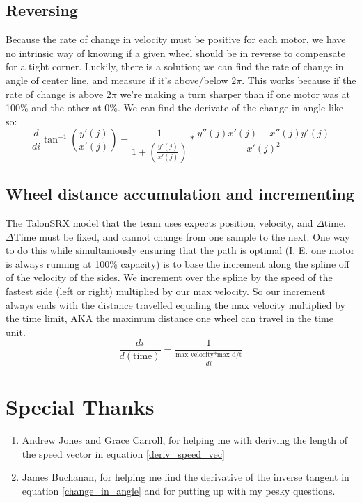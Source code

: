 \documentclass[12pt, english]{article}
\begin{document}
\subsection{Reversing}
Because the rate of change in velocity must be positive for each motor, we have no intrinsic way of knowing if a given wheel should be in reverse to compensate for a tight corner. Luckily, there is a solution; we can find the rate of change in angle of center line, and measure if it's above/below $2\pi$. This works because if the rate of change is above $2\pi$ we're making a turn sharper than if one motor was at 100\% and the other at 0\%. We can find the derivate of the change in angle like so:
\begin{equation}
	\label{change_in_angle}
	\frac{d}{di} 
	\tan^{-1}{\left(\frac{y'(j)}{x'(j)}\right)} = 
	\frac{1}{1 + \left(\frac{y'(j)}{x'(j)}\right)} * \frac{y''(j)x'(j) - x''(j)y'(j)}{x'(j)^2}
\end{equation}


\subsection{Wheel distance accumulation and incrementing}
The TalonSRX model that the team uses expects position, velocity, and $\Delta$time. $\Delta$Time must be fixed, and cannot change from one sample to the next. One way to do this while simultaniously ensuring that the path is optimal (I. E. one motor is always running at 100\% capacity) is to base the increment along the spline off of the velocity of the sides. We increment over the spline by the speed of the fastest side (left or right) multiplied by our max velocity. So our increment always ends with the distance travelled equaling the max velocity multiplied by the time limit, AKA the maximum distance one wheel can travel in the time unit.
\begin{equation}
	\frac{di}{d(\text{time})} = \frac{1}{\frac{\text{max velocity} * \text{max d/t}}{di}}
\end{equation}

\section{Special Thanks}
\begin{enumerate}
	\item Andrew Jones and Grace Carroll, for helping me with deriving the length of the speed vector in equation \ref{deriv_speed_vec}
	\item James Buchanan, for helping me find the derivative of the inverse tangent in equation \ref{change_in_angle} and for putting up with my pesky questions.
\end{enumerate}
\end{document}

